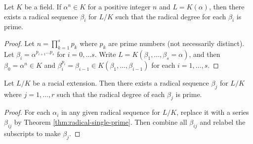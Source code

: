 \begin{theorem} \label{thm:radical-single-prime}
	Let $K$ be a field. If $\alpha ^ n \in K$ for a positive integer $n$ and  $L = K (\alpha)$, then there exists a radical sequence $\beta_i$ for $L / K$ such that the radical degree for each $\beta_i$ is prime.
\end{theorem}

\begin{proof}
	Let $n = \prod_{k=1}^{s} p_{k}$ where $p_{k}$ are prime numbers (not necessarily distinct). Let $\beta_{i} = \alpha^ {p_{i + 1} \dots  p_{s}}$ for $i = 0, \dots s$. Write $L = K(\beta_1,  \dots, \beta_s = \alpha)$, and then $\beta_0 = \alpha^n \in K$ and  $\beta_i ^ {p_i} = \beta_{i-1} \in K(\beta_1, \dots, \beta_{i - 1})$ for each $i  = 1, \dots, s$. 
\end{proof}


\begin{corollary} \label{thm:radical-all-prime}
	Let $L / K$ be a racial extension. Then there exists a radical sequence $\beta_j$ for $L / K$ where $j=1, \dots, r$ such that the radical degree of each $\beta_j$ is prime.
\end{corollary}

\begin{proof}
	For each $\alpha_i$ in any given radical sequence for $L / K$, replace it with a series $\beta_{ij}$ by Theorem \ref{thm:radical-single-prime}. Then combine all $\beta_{ij}$ and relabel the subscripts to make $\beta_{j}$. 
\end{proof}


